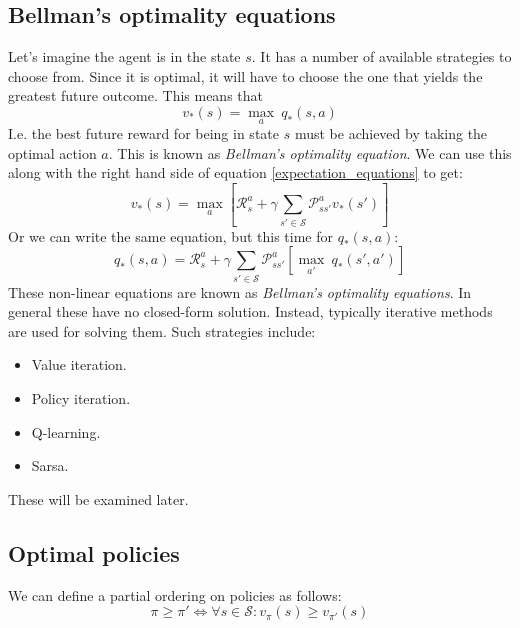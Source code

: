 \documentclass[12pt, a4paper]{article}
\numberwithin{equation}{section}
\begin{document}
\subsection{Bellman's optimality equations}
Let's imagine the agent is in the state $s$. It has a number of available strategies to choose from. Since it is optimal, it will have to choose the one that yields the greatest future outcome. This means that
\begin{equation}
v_*(s)=\underset{a}{\max}\ q_*(s,a)
\label{optimal_v_maxq}
\end{equation}
I.e. the best future reward for being in state $s$ must be achieved by taking the optimal action $a$. This is known as \textit{Bellman's optimality equation}.
We can use this along with the right hand side of equation \ref{expectation_equations} to get:
\begin{equation}
v_*(s)=\underset{a}{\max}\left[\mathcal{R}^a_s+\gamma\sum_{s'\in\mathcal{S}}\mathcal{P}^a_{ss'}v_*(s')\right]
\label{optimal_v}
\end{equation}
Or we can write the same equation, but this time for $q_*(s,a)$:
\begin{equation}
q_*(s,a)=\mathcal{R}^a_s+\gamma\sum_{s'\in\mathcal{S}}\mathcal{P}^a_{ss'}\left[\underset{a'}{\max}\ q_*(s',a')\right]
\label{optimal_q}
\end{equation}
These non-linear equations are known as \textit{Bellman's optimality equations}. In general these have no closed-form solution. Instead, typically iterative methods are used for solving them. Such strategies include:
\begin{itemize}
\item Value iteration.
\item Policy iteration.
\item Q-learning.
\item Sarsa.
\end{itemize}
These will be examined later.

\subsection{Optimal policies}
We can define a partial ordering on policies as follows:
\begin{equation}
\pi\ge\pi'\Leftrightarrow\forall s\in\mathcal{S}: v_\pi(s)\ge v_{\pi'}(s)
\end{equation}
\end{document}
